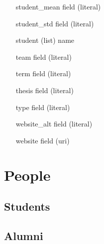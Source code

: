 \documentclass[11pt,letterpaper]{article}
\newcommand{\field}[1]{\textsf{#1}}
\begin{document}
\begin{itemize}
    \item[\field{student\_mean}] field (literal)
    \item[\field{student\_std}] field (literal)
    \item[\field{student}] (list) name
    \item[\field{team}] field (literal)
    \item[\field{term}] field (literal)
    \item[\field{thesis}] field (literal)
    \item[\field{type}] field (literal)
    \item[\field{website\_alt}] field (literal)
    \item[\field{website}] field (uri)
\end{itemize}


\section{People}\label{sec:people}


\subsection{Students}\label{sec:people-current-phd}

\begin{refsection}
  \setlength{\bibitemsep}{\baselineskip}
  \nocite{*}
  \begin{multicols}{2}
    \raggedcolumns
    \printbibliography[heading=none,type=student,resetnumbers=true,omitnumbers=true,env=people]
  \end{multicols}
\end{refsection}


\clearpage
\subsection{Alumni}\label{sec:people-alumni}

\begin{refsection}
  \setlength{\bibitemsep}{\baselineskip}
  \nocite{*}
  \begin{multicols}{2}
    \raggedcolumns
    \printbibliography[heading=none,type=alumnus,resetnumbers=true,omitnumbers=true,env=people]
  \end{multicols}
\end{refsection}
\end{document}
